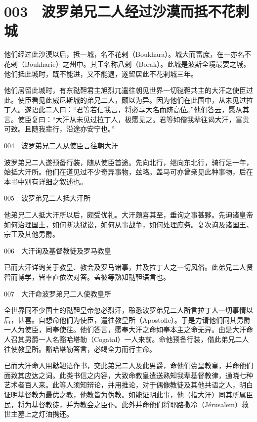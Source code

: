 \documentclass[12pt,UTF8]{ctexbook}
\begin{document}
\chapter{003　波罗弟兄二人经过沙漠而抵不花剌城}

他们经过此沙漠以后，抵一城，名不花剌（Boukhara）。城大而富庶，在一亦名不花剌（Boukharie）之州中。其王名称八剌（Borak）。此城是波斯全境最要之城。他们抵此城时，既不能进，又不能退，遂留居此不花剌城三年。

他们居留此城时，有东鞑靼君主旭烈兀遣往朝见世界一切鞑靼共主的大汗之使臣过此。使臣看见此威尼斯城的弟兄二人，颇以为异。因为他们在此国中，从未见过拉丁人。遂语此二人曰：“君等若信我言，将必享大名而跻高位。”他们答云，愿从其言。使臣复曰：“大汗从未见过拉丁人，极愿见之。君等如偕我辈往谒大汗，富贵可致。且随我辈行，沿途亦安宁也。”





004　波罗弟兄二人从使臣言往朝大汗

波罗弟兄二人遂预备行装，随从使臣首途。先向北行，继向东北行，骑行足一年，始抵大汗所。他们在道见过不少奇异事物，兹略。盖马可亦曾亲见此种事物，后在本书中别有详细之叙述也。





005　波罗弟兄二人抵大汗所

他弟兄二人抵大汗所以后，颇受优礼。大汗颇喜其至，垂询之事甚夥。先询诸皇帝如何治理国土，如何断决狱讼，如何从事战争，如何处理庶务。复次询及诸国王、宗王及其他男爵。





006　大汗询及基督教徒及罗马教皇

已而大汗详询关于教皇、教会及罗马诸事，并及拉丁人之一切风俗。此弟兄二人贤智而博学，皆率直依次对答。盖彼等熟知鞑靼语言也。





007　大汗命波罗弟兄二人使教皇所

全世界同不少国土的鞑靼皇帝忽必烈汗，聆悉波罗弟兄二人所言拉丁人一切事情以后，甚喜。自想命他们为使臣，遣往教皇所（Apostolle）。于是力请他们同其男爵一人为使臣，同奉使往。他们答言，愿奉大汗之命如奉本主之命无异。由是大汗命人召其男爵一人名豁哈塔勒（Cogatal）一人来前。命他预备行装，偕此弟兄二人往使教皇所。豁哈塔勒答言，必竭全力而行主命。

已而大汗命人用鞑靼语作书，交此弟兄二人及此男爵，命他们赍呈教皇，并命他们面致其应达之词。此类书信之内容，大致命教皇遣送熟知我辈基督教律，通晓七种艺术者百人来。此等人须知辩论，并用推论，对于偶像教徒及其他共语之人，明白证明基督教为最优之教，他教皆为伪教。如能证明此事，他（指大汗）同其所属臣民，将为基督教徒，并为教会之臣仆。此外并命他们将耶路撒冷（Jérusalem）救世主墓上之灯油携还。
\end{document}
